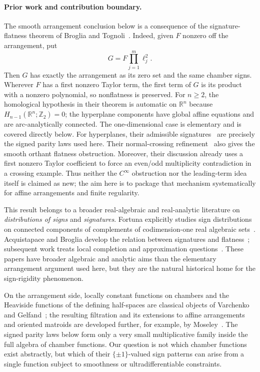 \documentclass[11pt]{article}
\theoremstyle{definition}
\theoremstyle{remark}
\newcommand{\R}{\mathbb{R}}
\begin{document}
\paragraph{Prior work and contribution boundary.}
The smooth arrangement conclusion below is a consequence of the signature-flatness theorem of Broglia and Tognoli~\cite[Theorem~4.2]{BrogliaTognoli1989}. Indeed, given $F$ nonzero off the arrangement, put
\[
 G=F\prod_{j=1}^m\ell_j^2.
\]
Then $G$ has exactly the arrangement as its zero set and the same chamber signs. Wherever $F$ has a first nonzero Taylor term, the first term of $G$ is its product with a nonzero polynomial, so nonflatness is preserved. For $n\ge2$, the homological hypothesis in their theorem is automatic on $\R^n$ because $H_{n-1}(\R^n;\mathbb Z_2)=0$; the hyperplane components have global affine equations and are arc-analytically connected. The one-dimensional case is elementary and is covered directly below. For hyperplanes, their admissible signatures~\cite[Definition~2.2]{BrogliaTognoli1989} are precisely the signed parity laws used here. Their normal-crossing refinement~\cite[Remark~4.6]{BrogliaTognoli1989} also gives the smooth orthant flatness obstruction. Moreover, their discussion already uses a first nonzero Taylor coefficient to force an even/odd multiplicity contradiction in a crossing example. Thus neither the $C^\infty$ obstruction nor the leading-term idea itself is claimed as new; the aim here is to package that mechanism systematically for affine arrangements and finite regularity.

This result belongs to a broader real-algebraic and real-analytic literature on \emph{distributions of signs} and \emph{signatures}. Fortuna explicitly studies sign distributions on connected components of complements of codimension-one real algebraic sets~\cite{Fortuna1991}. Acquistapace and Broglia develop the relation between signatures and flatness~\cite{AcquistapaceBroglia1992,AcquistapaceBroglia1993Correction}; subsequent work treats local completion and approximation questions~\cite{AcquistapaceBrogliaFortuna1994,AcquistapaceBroglia1994}. These papers have broader algebraic and analytic aims than the elementary arrangement argument used here, but they are the natural historical home for the sign-rigidity phenomenon.

On the arrangement side, locally constant functions on chambers and the Heaviside functions of the defining half-spaces are classical objects of Varchenko and Gelfand~\cite{VarchenkoGelfand1987}; the resulting filtration and its extensions to affine arrangements and oriented matroids are developed further, for example, by Moseley~\cite{Moseley2017}. The signed parity laws below form only a very small multiplicative family inside the full algebra of chamber functions. Our question is not which chamber functions exist abstractly, but which of their $\{\pm1\}$-valued sign patterns can arise from a single function subject to smoothness or ultradifferentiable constraints.
\end{document}
